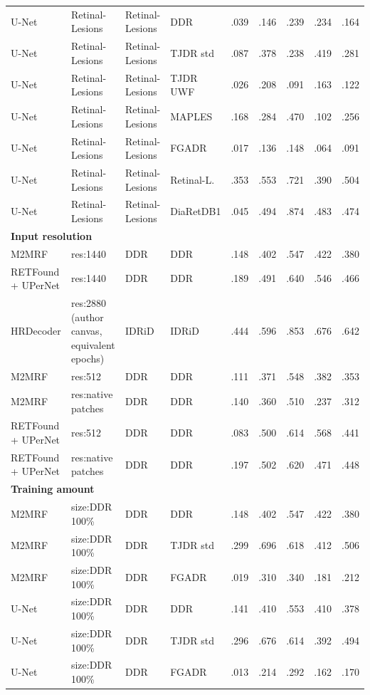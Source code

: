 \begin{landscape}
{\begin{longtable}{l l l l c c c c c}
U-Net & Retinal-Lesions & Retinal-Lesions & DDR & .039 & .146 & .239 & .234 & .164 \\
U-Net & Retinal-Lesions & Retinal-Lesions & TJDR std & .087 & .378 & .238 & .419 & .281 \\
U-Net & Retinal-Lesions & Retinal-Lesions & TJDR UWF & .026 & .208 & .091 & .163 & .122 \\
U-Net & Retinal-Lesions & Retinal-Lesions & MAPLES & .168 & .284 & .470 & .102 & .256 \\
U-Net & Retinal-Lesions & Retinal-Lesions & FGADR & .017 & .136 & .148 & .064 & .091 \\
U-Net & Retinal-Lesions & Retinal-Lesions & Retinal-L. & .353 & .553 & .721 & .390 & .504 \\
U-Net & Retinal-Lesions & Retinal-Lesions & DiaRetDB1 & .045 & .494 & .874 & .483 & .474 \\
\multicolumn{9}{l}{\textbf{Input resolution}}\\
M2MRF & res:1440 & DDR & DDR & .148 & .402 & .547 & .422 & .380 \\
RETFound + UPerNet & res:1440 & DDR & DDR & .189 & .491 & .640 & .546 & .466 \\
HRDecoder & res:2880 (author canvas, equivalent epochs) & IDRiD & IDRiD & .444 & .596 & .853 & .676 & .642 \\
M2MRF & res:512 & DDR & DDR & .111 & .371 & .548 & .382 & .353 \\
M2MRF & res:native patches & DDR & DDR & .140 & .360 & .510 & .237 & .312 \\
RETFound + UPerNet & res:512 & DDR & DDR & .083 & .500 & .614 & .568 & .441 \\
RETFound + UPerNet & res:native patches & DDR & DDR & .197 & .502 & .620 & .471 & .448 \\
\multicolumn{9}{l}{\textbf{Training amount}}\\
M2MRF & size:DDR 100\% & DDR & DDR & .148 & .402 & .547 & .422 & .380 \\
M2MRF & size:DDR 100\% & DDR & TJDR std & .299 & .696 & .618 & .412 & .506 \\
M2MRF & size:DDR 100\% & DDR & FGADR & .019 & .310 & .340 & .181 & .212 \\
U-Net & size:DDR 100\% & DDR & DDR & .141 & .410 & .553 & .410 & .378 \\
U-Net & size:DDR 100\% & DDR & TJDR std & .296 & .676 & .614 & .392 & .494 \\
U-Net & size:DDR 100\% & DDR & FGADR & .013 & .214 & .292 & .162 & .170 \\

\end{longtable}}
\end{landscape}
